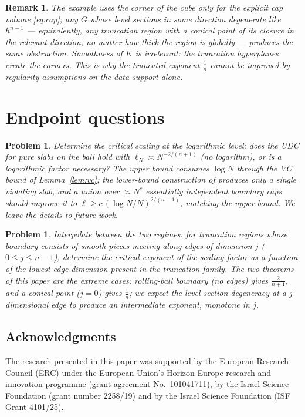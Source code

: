 ﻿\documentclass[11pt]{article}
\newtheorem{remark}[theorem]{Remark}
\newtheorem{problem}[theorem]{Problem}
\begin{document}
\begin{remark}
The example uses the corner of the cube only for the explicit cap volume
\eqref{eq:cap}; any $G$ whose level sections in some direction degenerate like
$h^{n-1}$ --- equivalently, any truncation region with a conical point of its
closure in the relevant direction, no matter how thick the region is globally
--- produces the same obstruction.  Smoothness of $K$ is irrelevant: the
truncation hyperplanes create the corners.  This is why the truncated exponent
$\frac1n$ cannot be improved by regularity assumptions on the data support
alone.
\end{remark}

\section{Endpoint questions}\label{sec:final}

\begin{problem}
Determine the critical scaling at the logarithmic level: does the UDC for pure
slabs on the ball hold with $\ell_N\asymp N^{-2/(n+1)}$ (no logarithm), or is
a logarithmic factor necessary?  The upper bound consumes
$\log N$ through the VC bound of Lemma~\ref{lem:vc}; the lower-bound
construction of \cite{companion2} produces only a single violating slab, and a
union over $\asymp N^{c}$ essentially independent boundary caps should improve
it to $\ell\ge c\,(\log N/N)^{2/(n+1)}$, matching the upper bound.  We leave
the details to future work.
\end{problem}

\begin{problem}
Interpolate between the two regimes: for truncation regions whose boundary
consists of smooth pieces meeting along edges of dimension $j$
{\rm(}$0\le j\le n-1${\rm)}, determine the critical exponent of the scaling
factor as a function of the lowest edge dimension present in the truncation
family.  The two theorems of this paper are the extreme cases: rolling-ball
boundary (no edges) gives $\frac{2}{n+1}$, and a conical point ($j=0$) gives
$\frac1n$; we expect the level-section degeneracy at a $j$-dimensional edge to
produce an intermediate exponent, monotone in $j$.
\end{problem}

\subsection*{Acknowledgments}
The research presented in this paper was supported by the European Research
Council (ERC) under the European Union's Horizon Europe research and innovation
programme (grant agreement No.\ 101041711), by the Israel Science Foundation
(grant number 2258/19) and by the Israel Science Foundation (ISF Grant
4101/25).
\end{document}
